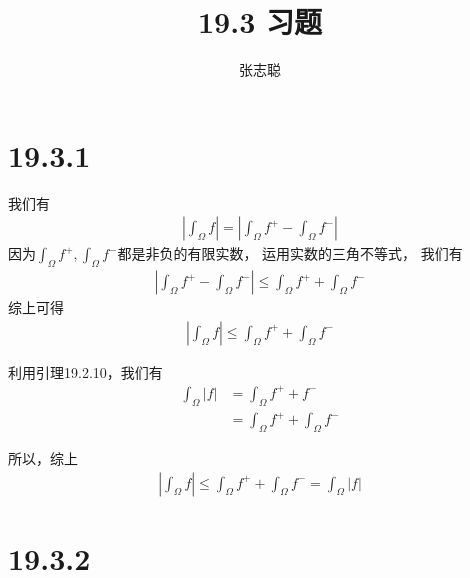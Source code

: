 \documentclass{article}
\begin{document}
\title{19.3 习题}
\author{张志聪}
\maketitle

\section*{19.3.1}

我们有
\begin{align*}
  \left| \int_{\Omega} f \right|
  = \left|\int_{\Omega} f^+ - \int_{\Omega} f^-\right|
\end{align*}
因为$\int_{\Omega} f^+, \int_{\Omega} f^-$都是非负的有限实数，
运用实数的三角不等式， 我们有
\begin{align*}
  \left|\int_{\Omega} f^+ - \int_{\Omega} f^-\right| \leq \int_{\Omega} f^+ + \int_{\Omega} f^-
\end{align*}
综上可得
\begin{align*}
  \left| \int_{\Omega} f \right| \leq \int_{\Omega} f^+ + \int_{\Omega} f^-
\end{align*}

利用引理19.2.10，我们有
\begin{align*}
  \int_{\Omega} |f|
   & = \int_{\Omega} f^+ + f^-               \\
   & = \int_{\Omega} f^+ + \int_{\Omega} f^-
\end{align*}

所以，综上
\begin{align*}
  \left| \int_{\Omega} f \right| \leq \int_{\Omega} f^+ + \int_{\Omega} f^- = \int_{\Omega} |f|
\end{align*}

\section*{19.3.2}
\end{document}
